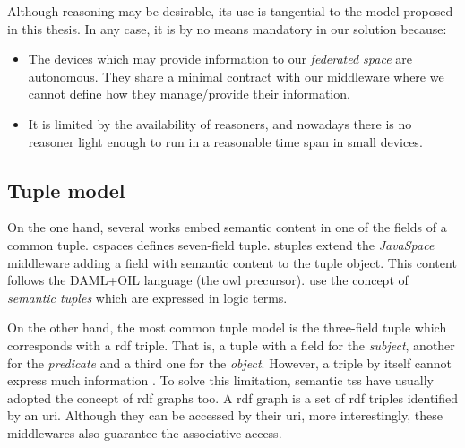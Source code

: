 Although reasoning may be desirable, its use is tangential to the model proposed in this thesis.
In any case, it is by no means mandatory in our solution because:
\begin{itemize}
  \item The devices which may provide information to our \emph{federated space} are autonomous.
	They share a minimal contract with our middleware where we cannot define how they manage/provide their information.
  \item It is limited by the availability of reasoners, and nowadays there is no reasoner light enough to run in a reasonable time span in small devices.
\end{itemize}




\subsection{Tuple model}

On the one hand, several works embed semantic content in one of the fields of a common tuple.
\ac{cspaces} \citep{martinrecuerda_towards_2005} defines seven-field tuple.
\ac{stuples}\citep{khushraj_stuples:_2004} extend the \emph{JavaSpace} \citep{freeman_javaspaces_1999} middleware adding a field with semantic content to the tuple object.
This content follows the DAML+OIL language (the \ac{owl} precursor).
\citet{nardini_semantic_2013} use the concept of \emph{semantic tuples} which are expressed in logic terms.


On the other hand, the most common tuple model is the three-field tuple which corresponds with a \ac{rdf} triple.
That is, a tuple with a field for the \emph{subject}, another for the \emph{predicate} and a third one for the \emph{object}.
However, a triple by itself cannot express much information \citep{krummenacher2006specification}.
To solve this limitation, semantic \acp{ts} have usually adopted the concept of \ac{rdf} graphs too.
A \ac{rdf} graph is a set of \ac{rdf} triples identified by an \ac{uri}. %
Although they can be accessed by their \ac{uri}, more interestingly, these middlewares also guarantee the associative access. %

